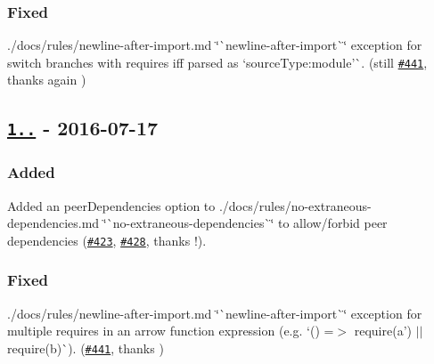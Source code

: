 \subsubsection*{Fixed}


\begin{DoxyItemize}
\item ./docs/rules/newline-\/after-\/import.md \char`\"{}\`{}newline-\/after-\/import\`{}\char`\"{} exception for {\ttfamily switch} branches with {\ttfamily require}s iff parsed as `source\+Type\+:\textquotesingle{}module'\`{}. (still \href{https://github.com/benmosher/eslint-plugin-import/issues/441}{\tt \#441}, thanks again \href{https://github.com/ljharb}{\tt })
\end{DoxyItemize}

\subsection*{\href{https://github.com/benmosher/eslint-plugin-import/compare/v1.10.3...v1.11.0}{\tt 1..} -\/ 2016-\/07-\/17}

\subsubsection*{Added}


\begin{DoxyItemize}
\item Added an {\ttfamily peer\+Dependencies} option to ./docs/rules/no-\/extraneous-\/dependencies.md \char`\"{}\`{}no-\/extraneous-\/dependencies\`{}\char`\"{} to allow/forbid peer dependencies (\href{https://github.com/benmosher/eslint-plugin-import/issues/423}{\tt \#423}, \href{https://github.com/benmosher/eslint-plugin-import/pull/428}{\tt \#428}, thanks \href{https://github.com/jfmengels}{\tt }!).
\end{DoxyItemize}

\subsubsection*{Fixed}


\begin{DoxyItemize}
\item ./docs/rules/newline-\/after-\/import.md \char`\"{}\`{}newline-\/after-\/import\`{}\char`\"{} exception for multiple {\ttfamily require}s in an arrow function expression (e.\+g. `() =$>$ require(\textquotesingle{}a') $\vert$$\vert$ require(\textquotesingle{}b\textquotesingle{})\`{}). (\href{https://github.com/benmosher/eslint-plugin-import/issues/441}{\tt \#441}, thanks \href{https://github.com/ljharb}{\tt })
\end{DoxyItemize}

